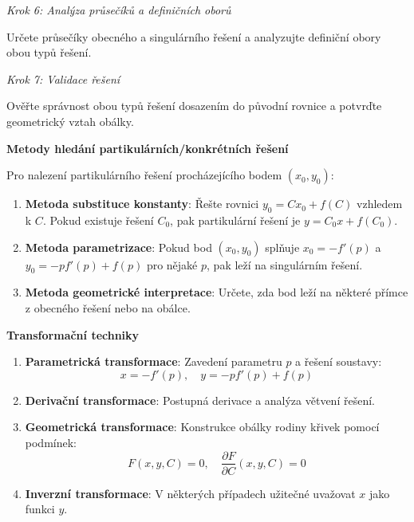 \vspace{1\baselineskip}

\noindent\textit{Krok 6: Analýza průsečíků a definičních oborů}

Určete průsečíky obecného a singulárního řešení a analyzujte definiční obory obou typů řešení.

\vspace{1\baselineskip}

\noindent\textit{Krok 7: Validace řešení}

Ověřte správnost obou typů řešení dosazením do původní rovnice a potvrďte geometrický vztah obálky.

\vspace{1\baselineskip}

\noindent\textbf{Metody hledání partikulárních/konkrétních řešení}

Pro nalezení partikulárního řešení procházejícího bodem $(x_0, y_0)$:

\begin{enumerate}
\item \textbf{Metoda substituce konstanty}: Řešte rovnici $y_0 = Cx_0 + f(C)$ vzhledem k $C$. Pokud existuje řešení $C_0$, pak partikulární řešení je $y = C_0x + f(C_0)$.

\item \textbf{Metoda parametrizace}: Pokud bod $(x_0, y_0)$ splňuje $x_0 = -f'(p)$ a $y_0 = -pf'(p) + f(p)$ pro nějaké $p$, pak leží na singulárním řešení.

\item \textbf{Metoda geometrické interpretace}: Určete, zda bod leží na některé přímce z obecného řešení nebo na obálce.
\end{enumerate}

\vspace{1\baselineskip}

\noindent\textbf{Transformační techniky}

\begin{enumerate}
\item \textbf{Parametrická transformace}: Zavedení parametru $p$ a řešení soustavy:
\[
x = -f'(p), \quad y = -pf'(p) + f(p)
\]

\item \textbf{Derivační transformace}: Postupná derivace a analýza větvení řešení.

\item \textbf{Geometrická transformace}: Konstrukce obálky rodiny křivek pomocí podmínek:
\[
F(x, y, C) = 0, \quad \frac{\partial F}{\partial C}(x, y, C) = 0
\]

\item \textbf{Inverzní transformace}: V některých případech užitečné uvažovat $x$ jako funkci $y$.
\end{enumerate}

